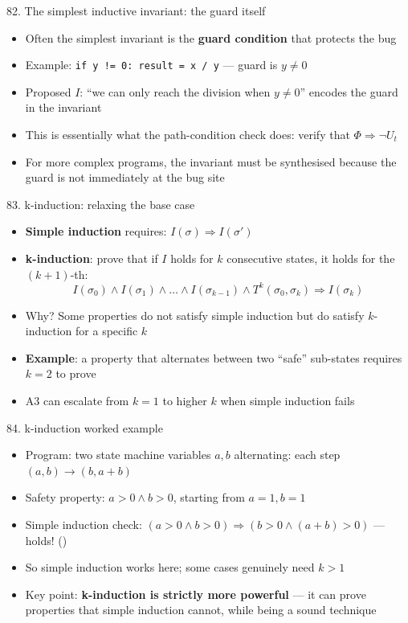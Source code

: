 \documentclass[aspectratio=169]{beamer}
\begin{document}
\begin{frame}{82. The simplest inductive invariant: the guard itself}
\begin{itemize}
  \item Often the simplest invariant is the \textbf{guard condition} that protects the bug
  \item Example: \texttt{if y != 0: result = x / y} --- guard is \(y \ne 0\)
  \item Proposed \(I\): ``we can only reach the division when \(y \ne 0\)'' encodes the guard in the invariant
  \item This is essentially what the path-condition check does: verify that \(\Phi \Rightarrow \neg U_t\)
  \item For more complex programs, the invariant must be synthesised because the guard is not immediately at the bug site
\end{itemize}
\end{frame}

\begin{frame}{83. k-induction: relaxing the base case}
\begin{itemize}
  \item \textbf{Simple induction} requires: \(I(\sigma) \Rightarrow I(\sigma')\)
  \item \textbf{k-induction}: prove that if \(I\) holds for \(k\) consecutive states, it holds for the \((k+1)\)-th:
    \[
    I(\sigma_0) \wedge I(\sigma_1) \wedge \ldots \wedge I(\sigma_{k-1}) \wedge T^k(\sigma_0, \sigma_k) \Rightarrow I(\sigma_k)
    \]
  \item Why? Some properties do not satisfy simple induction but do satisfy \(k\)-induction for a specific \(k\)
  \item \textbf{Example}: a property that alternates between two ``safe'' sub-states requires \(k=2\) to prove
  \item A3 can escalate from \(k=1\) to higher \(k\) when simple induction fails
\end{itemize}
\end{frame}

\begin{frame}{84. k-induction worked example}
\begin{itemize}
  \item Program: two state machine variables \(a, b\) alternating: each step \((a,b) \to (b, a+b)\)
  \item Safety property: \(a > 0 \wedge b > 0\), starting from \(a=1, b=1\)
  \item Simple induction check: \((a > 0 \wedge b > 0) \Rightarrow (b > 0 \wedge (a+b) > 0)\) --- holds! (\checkmark)
  \item So simple induction works here; some cases genuinely need \(k > 1\)
  \item Key point: \textbf{k-induction is strictly more powerful} --- it can prove properties that simple induction cannot, while being a sound technique
\end{itemize}
\end{frame}
\end{document}
